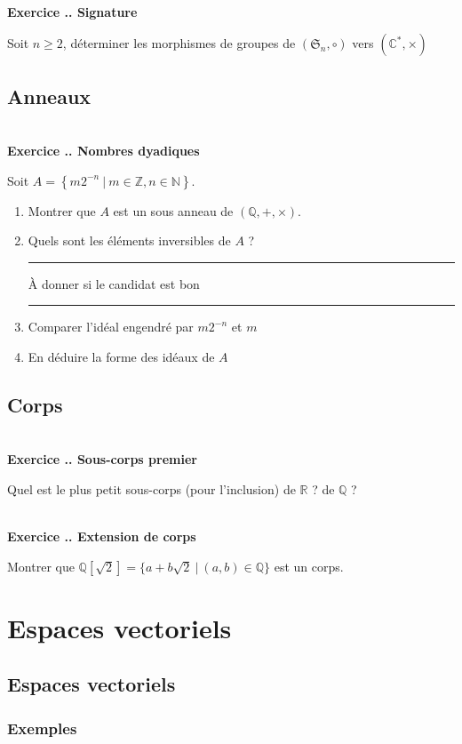 \documentclass{article}
\newcommand{\mb}[1]{\mathbb{#1}}
\newcommand{\mf}[1]{\mathfrak{#1}}
\newcounter{exo}
\newcommand{\exercice}[1][\null]{\textbf{\\ Exercice \thesection.\theexo. #1} \addtocounter{exo}{1}}
\begin{document}
\exercice[Signature]

Soit $n \geq 2$, déterminer les morphismes de groupes de $(\mf{S}_n,\circ)$ vers
$(\mb{C}^*,\times)$

\subsection{Anneaux}

\exercice[Nombres dyadiques]

Soit $A = \left\{ m 2^{-n} ~|~ m \in \mb{Z}, n \in \mb{N} \right\}$.
\begin{enumerate}
    \item Montrer que $A$ est un sous anneau de $(\mb{Q}, +, \times)$.
    \item Quels sont les éléments inversibles de $A$ ?
        \begin{center}
            \rule{5em}{2pt}
            À donner si le candidat est bon 
            \rule{5em}{2pt}
        \end{center}
    \item Comparer l'idéal engendré par $m 2^{-n}$ et $m$ 
    \item En déduire la forme des idéaux de $A$
\end{enumerate}

\subsection{Corps}

\exercice[Sous-corps premier]

Quel est le plus petit sous-corps (pour l'inclusion) de $\mb{R}$ ? de $\mb{Q}$ ?

\exercice[Extension de corps]

Montrer que $\mb{Q}[\sqrt{2}] = \{ a + b\sqrt{2} ~|~ (a,b) \in \mb{Q} \}$
est un corps.








\section{Espaces vectoriels}

\subsection{Espaces vectoriels}

\subsubsection{Exemples}
\end{document}
